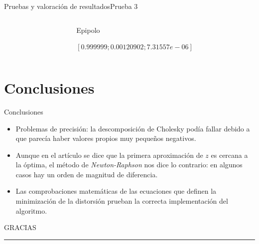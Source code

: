 \documentclass[aspectratio=169,14pt,spanish]{beamer}
\begin{document}
\begin{frame}{Pruebas y valoración de resultados}{Prueba 3}
\begin{overlayarea}{\textwidth}{8cm}
{\begin{columns}
\begin{column}{0.2\textwidth}
              \end{column}
              \begin{column}{0.8\textwidth}
                Epipolo

                $[0.999999; 0.00120902; 7.31557e-06]$
              \end{column}
            \end{columns}

            }

        \end{overlayarea}
      \end{frame}

    \section{Conclusiones}

    \begin{frame}{Conclusiones}

      \begin{itemize}
        \item Problemas de precisión: la descomposición de Cholesky podía fallar debido a que parecía haber valores propios muy pequeños negativos.
        \item Aunque en el artículo se dice que la primera aproximación de $z$ es cercana a la óptima, el método de \emph{Newton-Raphson} nos dice lo contrario: en algunos casos hay un orden de magnitud de diferencia.
        \item Las comprobaciones matemáticas de las ecuaciones que definen la minimización de la distorsión prueban la correcta implementación del algoritmo.
      \end{itemize}
    \end{frame}

    \begin{frame}[plain]
      \huge{GRACIAS}
      \vspace{2mm}
      \hrule
    \end{frame}
\end{document}
